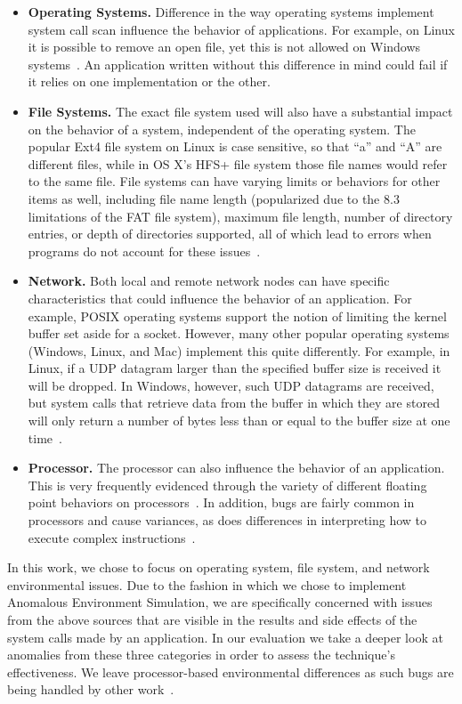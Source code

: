 \begin{itemize}

\item {\bf Operating Systems.} Difference in the way operating systems
implement system call scan influence the behavior of applications.  For
example, on Linux it is possible to remove an open file, yet this is not
allowed on Windows systems~\cite{UnlinkStandard}.  An application
written without this difference in mind could fail if it relies on one
implementation or the other.

\item {\bf File Systems.}  The exact file system used will also have a
substantial impact on the behavior of a system, independent of the
operating system.  The popular Ext4 file system on Linux is case sensitive,
so that ``a'' and ``A'' are different files,
while in OS X's HFS+ file system
those file names would refer to the same file.
File systems can have varying limits or behaviors for other items as well,
including file name length (popularized due to the 8.3 limitations of the
FAT file system), maximum file length, number of directory entries, or
depth
of directories supported, all of which lead to errors when programs
do not account for these issues~\cite{EXT4Layout, AppleHFS}.

\item {\bf Network.} Both local and remote network nodes
can have specific characteristics that could influence the behavior of an
application.
For example, POSIX operating
systems support the notion of limiting the kernel buffer set aside for a
socket.  However, many other popular operating
systems (Windows, Linux, and Mac)
implement this quite differently.  For example, in Linux, if a UDP datagram
larger than the specified buffer size is received it will be dropped.  In
Windows, however, such
UDP datagrams are
received, but system calls that retrieve data from the buffer in which
they are
stored will only return a number of bytes less than or equal to the
buffer size at one time~\cite{Zhuang_NSDI_2014}.

\item {\bf Processor.}  The processor can also influence the
behavior of an application.  This is very frequently
evidenced through the variety of different floating point behaviors on
processors~\cite{ArbitraryPrecision}.  In addition, bugs are fairly common
in processors and cause variances, as does differences in interpreting
how to execute complex instructions~\cite{Microarch}.

\end{itemize}

In this work, we chose to focus on operating system,
file system, and network
environmental issues.
Due to the fashion in which we chose 
to implement Anomalous Environment Simulation,
we are specifically concerned with issues from the above sources
that are visible in the results and side effects of the system calls
made by an application.
In our evaluation we take a deeper look at anomalies from
these three categories in order to assess the technique's effectiveness.
We leave processor-based environmental differences as such
bugs are being handled by other
work~\cite{Alglave:2018:FSC:3173162.3177156}.
